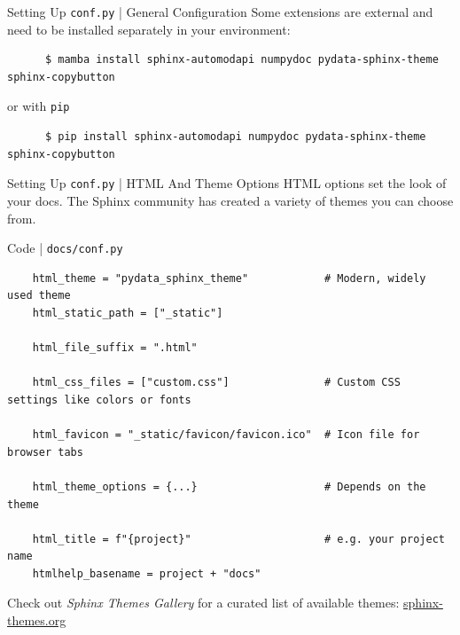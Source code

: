 \begin{frame}[fragile]{Setting Up \texttt{conf.py} | General Configuration}
    Some extensions are external and need to be installed separately in your environment:
    \begin{verbatim}
      $ mamba install sphinx-automodapi numpydoc pydata-sphinx-theme sphinx-copybutton
    \end{verbatim}
    or with \texttt{pip}
    \begin{verbatim}
      $ pip install sphinx-automodapi numpydoc pydata-sphinx-theme sphinx-copybutton
    \end{verbatim}
\end{frame}


\begin{frame}[fragile]{Setting Up \texttt{conf.py} | HTML And Theme Options}
  HTML options set the look of your docs. The Sphinx community has created a variety of
  themes you can choose from.
  \begin{block}{Code | \texttt{docs/conf.py}}
  \footnotesize
  \begin{verbatim}
    html_theme = "pydata_sphinx_theme"            # Modern, widely used theme
    html_static_path = ["_static"]

    html_file_suffix = ".html"

    html_css_files = ["custom.css"]               # Custom CSS settings like colors or fonts

    html_favicon = "_static/favicon/favicon.ico"  # Icon file for browser tabs

    html_theme_options = {...}                    # Depends on the theme

    html_title = f"{project}"                     # e.g. your project name
    htmlhelp_basename = project + "docs"
  \end{verbatim}
  \end{block}
  Check out \emph{Sphinx Themes Gallery} for a curated list of available themes:
  \href{https://sphinx-themes.org/}{sphinx-themes.org}
\end{frame}


